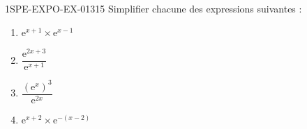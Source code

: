 \begin{exercice}{1SPE-EXPO-EX-013}{1}{5}
Simplifier chacune des expressions suivantes :
\begin{enumerate}
  \item $\mathrm{e}^{x+1} \times \mathrm{e}^{x-1}$
  \item $\dfrac{\mathrm{e}^{2x+3}}{\mathrm{e}^{x+1}}$
  \item $\dfrac{\left(\mathrm{e}^{x}\right)^3}{\mathrm{e}^{2x}}$
  \item $\mathrm{e}^{x+2} \times \mathrm{e}^{-(x-2)}$
\end{enumerate}
\end{exercice}

